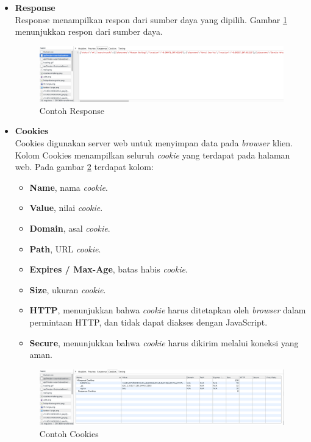 \begin{itemize}
	\item \textbf{Response}\\
			Response menampilkan respon dari sumber daya yang dipilih. Gambar \ref{fig:2_devtools_network_response} menunjukkan respon dari sumber daya.
			
			\begin{figure}[H]
				\centering
				\includegraphics[scale=0.3]{Gambar/devtools-network-response}
				\caption{Contoh Response} 
				\label{fig:2_devtools_network_response}
			\end{figure}
			
	\item \textbf{Cookies}\\
			Cookies digunakan server web untuk menyimpan data pada \textit{browser} klien.  Kolom Cookies menampilkan seluruh \textit{cookie} yang terdapat pada halaman web. Pada gambar \ref{fig:2_devtools_network_cookies} terdapat kolom:
			\begin{itemize}
				\item \textbf{Name}, nama \textit{cookie}.
				\item \textbf{Value}, nilai \textit{cookie}.
				\item \textbf{Domain}, asal \textit{cookie}.
				\item \textbf{Path}, URL \textit{cookie}.
				\item \textbf{Expires / Max-Age}, batas habis \textit{cookie}.
				\item \textbf{Size}, ukuran \textit{cookie}.
				\item \textbf{HTTP}, menunjukkan bahwa \textit{cookie} harus ditetapkan oleh \textit{browser} dalam permintaan HTTP, dan tidak dapat diakses dengan JavaScript.
				\item \textbf{Secure}, menunjukkan bahwa \textit{cookie} harus dikirim melalui koneksi yang aman.
			\end{itemize}					 
			
			\begin{figure}[H]
				\centering
				\includegraphics[scale=0.3]{Gambar/devtools-network-cookies}
				\caption{Contoh Cookies} 
				\label{fig:2_devtools_network_cookies}
			\end{figure}
\end{itemize}

